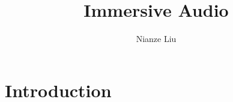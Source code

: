 \documentclass[jou]{apa6}
\title{Immersive Audio}
\author{Nianze Liu}
\affiliation{New York University}
\begin{document}
\maketitle

\section{Introduction}

\printbibliography
\end{document}
